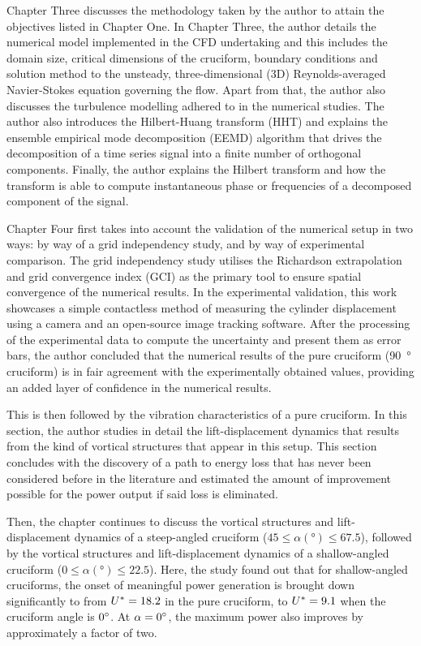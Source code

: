 \documentclass[oneside]{utmthesis}
\begin{document}
Chapter Three discusses the methodology taken by the author to attain the objectives listed in Chapter One. In Chapter Three, the author details the numerical model implemented in the CFD undertaking and this includes the domain size, critical dimensions of the cruciform, boundary conditions and solution method to the unsteady, three-dimensional (3D) Reynolds-averaged Navier-Stokes equation governing the flow. Apart from that, the author also discusses the turbulence modelling adhered to in the numerical studies. The author also introduces the Hilbert-Huang transform (HHT) and explains the ensemble empirical mode decomposition (EEMD) algorithm that drives the decomposition of a time series signal into a finite number of orthogonal components. Finally, the author explains the Hilbert transform and how the transform is able to compute instantaneous phase or frequencies of a decomposed component of the signal.

Chapter Four first takes into account the validation of the numerical setup in two ways: by way of a grid independency study, and by way of experimental comparison. The grid independency study utilises the Richardson extrapolation and grid convergence index (GCI) as the primary tool to ensure spatial convergence of the numerical results. In the experimental validation, this work showcases a simple contactless method of measuring the cylinder displacement using a camera and an open-source image tracking software. After the processing of the experimental data to compute the uncertainty and present them as error bars, the author concluded that the numerical results of the pure cruciform (\SI{90}{\degree} cruciform) is in fair agreement with the experimentally obtained values, providing an added layer of confidence in the numerical results.

This is then followed by the vibration characteristics of a pure cruciform. In this section, the author studies in detail the lift-displacement dynamics that results from the kind of vortical structures that appear in this setup. This section concludes with the discovery of a path to energy loss that has never been considered before in the literature and estimated the amount of improvement possible for the power output if said loss is eliminated.

Then, the chapter continues to discuss the vortical structures and lift-displacement dynamics of a steep-angled cruciform ($45 \le \alpha (\si{\degree}) \le 67.5$), followed by the vortical structures and lift-displacement dynamics of a shallow-angled cruciform ($0 \le \alpha (\si{\degree}) \le 22.5$). Here, the study found out that for shallow-angled cruciforms, the onset of meaningful power generation is brought down significantly to from $U^{*} = 18.2$ in the pure cruciform, to $U^{*} = 9.1$ when the cruciform angle is $\angon$. At $\alpha = \angon$, the maximum power also improves by approximately a factor of two.
\end{document}
